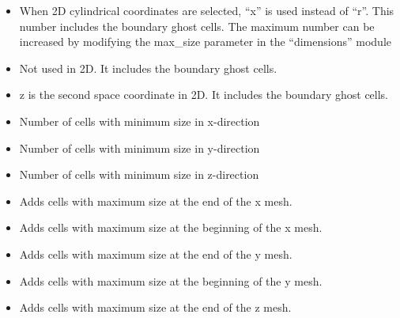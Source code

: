 \begin{itemize}
\item
{}
{When 2D cylindrical coordinates are selected, ``x'' is used instead 
 of ``r''. This number includes the boundary ghost cells. The maximum number can be 
 increased by modifying the max\_size parameter in the ``dimensions'' module}

\item
{}
{Not used in 2D. It includes the boundary ghost cells.}

\item
{}
{z is the second space coordinate in 2D. It includes the boundary ghost cells.}

\item
{}
{Number of cells with minimum size in x-direction}

\item
{}
{Number of cells with minimum size in y-direction}

\item
{}
{Number of cells with minimum size in z-direction}

\item
{}
{Adds cells with maximum size  at the end of the x mesh.}

\item
{}
{Adds cells with maximum size  at the beginning of the x mesh.}

\item
{}
{Adds cells with maximum size  at the end of the y mesh.}

\item
{}
{Adds cells with maximum size  at the beginning of the y mesh.}

\item
{}
{Adds cells with maximum size  at the end of the z mesh.}


\end{itemize}
